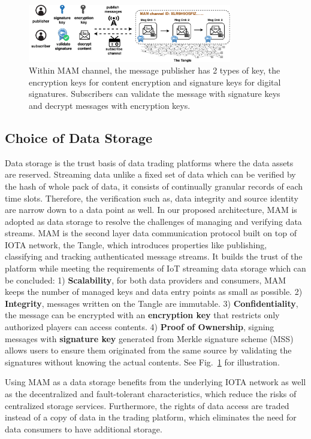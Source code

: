 \documentclass[conference]{IEEEtran}
\begin{document}
\begin{figure}[h]
    \centering
    \includegraphics[width=3.5in]{channel_and_key_fold}
    \caption{Within MAM channel, the message publisher has 2 types of key, the encryption keys for content encryption and signature keys for digital signatures. Subscribers can validate the message with signature keys and decrypt messages with encryption keys.}
    \label{fig:channel_and_key}
\end{figure}

\subsection{Choice of Data Storage}
Data storage is the trust basis of data trading platforms where the data assets are reserved. Streaming data unlike a fixed set of data which can be verified by the hash of whole pack of data, it consists of continually granular records of each time slots. Therefore, the verification such as, data integrity and source identity are narrow down to a data point as well. In our proposed architecture, MAM is adopted as data storage to resolve the challenges of managing and verifying data streams. MAM is the second layer data communication protocol built on top of IOTA network, the Tangle, which introduces properties like publishing, classifying and tracking authenticated message streams. It builds the trust of the platform while meeting the requirements of IoT streaming data storage which can be concluded: 1) \textbf{Scalability}, for both data providers and consumers, MAM keeps the number of managed keys and data entry points as small as possible. 2) \textbf{Integrity}, messages written on the Tangle are immutable. 3) \textbf{Confidentiality}, the message can be encrypted with an \textbf{encryption key} that restricts only authorized players can access contents. 4) \textbf{Proof of Ownership}, signing messages with \textbf{signature key} generated from Merkle signature scheme\cite{MSS} (MSS) allows users to ensure them originated from the same source by validating the signatures without knowing the actual contents. See Fig.~\ref{fig:channel_and_key} for illustration. 

Using MAM as a data storage benefits from the underlying IOTA network as well as the decentralized and fault-tolerant characteristics, which reduce the risks of centralized storage services. Furthermore, the rights of data access are traded instead of a copy of data in the trading platform, which eliminates the need for data consumers to have additional storage.
\end{document}
